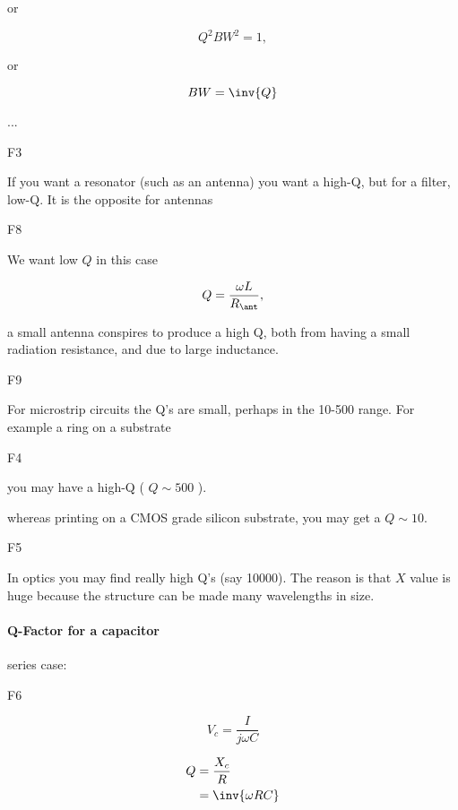 or

\begin{equation}\label{eqn:uwavesDeck8ResonatorQfactorCore:280}
Q^2 BW^2 = 1,
\end{equation}

or

\begin{equation}\label{eqn:uwavesDeck8ResonatorQfactorCore:300}
BW = \inv{Q}
\end{equation}

...

F3

If you want a resonator (such as an antenna) you want a high-Q, but for a filter, low-Q.  It is the opposite for antennas

F8

We want low \( Q \) in this case

\begin{equation}\label{eqn:uwavesDeck8ResonatorQfactorCore:n}
Q = \frac{\omega L}{R_\ant},
\end{equation}

a small antenna conspires to produce a high Q, both from having a small radiation resistance, and due to large inductance.

F9

For microstrip circuits the Q's are small, perhaps in the 10-500 range.  For example a ring on a substrate

F4

you may have a high-Q ( \( Q \sim 500 \) ).

whereas printing on a CMOS grade silicon substrate, you may get a \(Q \sim 10\).

F5

In optics you may find really high Q's (say 10000).  The reason is that \( X \) value is huge because the structure can be made many wavelengths in size.

\paragraph{Q-Factor for a capacitor}

series case:

F6

\begin{equation}\label{eqn:uwavesDeck8ResonatorQfactorCore:320}
V_c = \frac{I}{j \omega C}
\end{equation}

\begin{equation}\label{eqn:uwavesDeck8ResonatorQfactorCore:n}
\begin{aligned}
Q &= \frac{X_c}{R} \\ &= \inv{\omega R C}
\end{aligned}
\end{equation}

